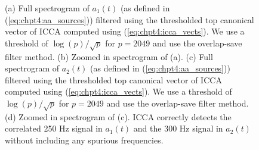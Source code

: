 \begin{figure}
\begin{center}
{    }   
    \caption{(a) Full spectrogram of $a_1(t)$ (as defined in (\ref{eq:chpt4:aa_sources}))
      filtered using the thresholded top canonical vector of ICCA computed using
      (\ref{eq:chpt4:icca_vects}). We use a threshold of $\log(p)/\sqrt{p}$ for $p=2049$
      and use the overlap-save filter method. (b) Zoomed in spectrogram of (a). (c) Full
      spectrogram of $a_2(t)$ (as defined in (\ref{eq:chpt4:aa_sources})) filtered using
      the thresholded top canonical vector of ICCA computed using
      (\ref{eq:chpt4:icca_vects}). We use a threshold of $\log(p)/\sqrt{p}$ for $p=2049$
      and use the overlap-save filter method. (d) Zoomed in spectrogram of (c).  ICCA
      correctly detects the correlated 250 Hz signal in $a_1(t)$ and the 300 Hz signal in
      $a_2(t)$ without including any spurious frequencies.}
    \label{fig:chpt4:aa_icca_spectrograms}
  \end{center}
\end{figure}
